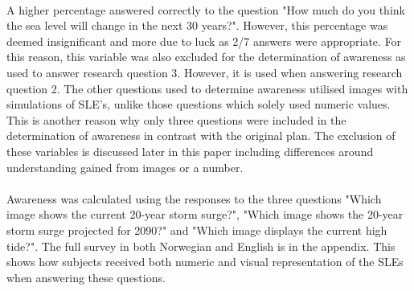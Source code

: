 \paragraph{}
A higher percentage answered correctly to the question "How much do you think the sea level will change in the next 30 years?". However, this percentage was deemed insignificant and more due to luck as 2/7 answers were appropriate. For this reason, this variable was also excluded for the determination of awareness as used to answer research question 3. However, it is used when answering research question 2. The other questions used to determine awareness utilised images with simulations of SLE's, unlike those questions which solely used numeric values. This is another reason why only three questions were included in the determination of awareness in contrast with the original plan. The exclusion of these variables is discussed later in this paper including differences around understanding gained from images or a number.
\paragraph{}
Awareness was calculated using the responses to the three questions "Which image shows the current 20-year storm surge?", "Which image shows the 20-year storm surge projected for 2090?" and "Which image displays the current high tide?". The full survey in both Norwegian and English is in the appendix. This shows how subjects received both numeric and visual representation of the SLEs when answering these questions. 



